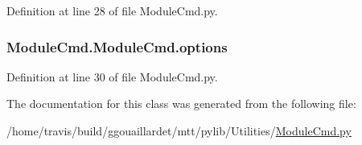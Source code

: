 Definition at line 28 of file Module\-Cmd.\-py.

\hypertarget{classModuleCmd_1_1ModuleCmd_a981a0fc879a722b76faa16b4289ab953}{
\subsubsection[{options}]{\setlength{\rightskip}{0pt plus 5cm}Module\-Cmd.\-Module\-Cmd.\-options}}\label{classModuleCmd_1_1ModuleCmd_a981a0fc879a722b76faa16b4289ab953}


Definition at line 30 of file Module\-Cmd.\-py.



The documentation for this class was generated from the following file\-:\begin{DoxyCompactItemize}
\item 
/home/travis/build/ggouaillardet/mtt/pylib/\-Utilities/\hyperlink{ModuleCmd_8py}{Module\-Cmd.\-py}\end{DoxyCompactItemize}
